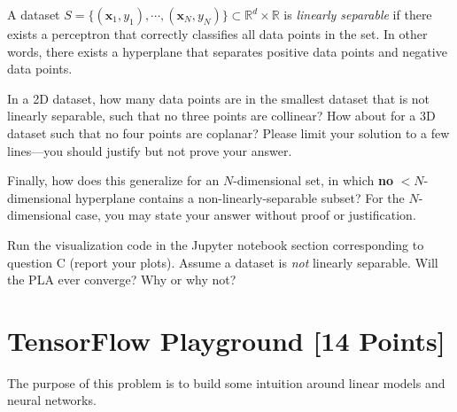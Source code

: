 \begin{solution}


\end{solution}

\begin{problem}[4]
A dataset $S = \{(\mathbf{x}_1, y_1),\cdots,(\mathbf{x}_N, y_N)\} \subset \mathbb{R}^d \times \mathbb{R}$ is \emph{linearly separable} if there exists a perceptron that correctly classifies all data points in the set.
In other words, there exists a hyperplane that separates positive data points and negative data points.

In a 2D dataset, how many data points are in the smallest dataset that is not linearly separable, such that no three points are collinear? How about for a 3D dataset such that no four points are coplanar?
Please limit your solution to a few lines---you should justify but not prove your answer.

Finally, how does this generalize for an $N$-dimensional set, in which \textbf{no} $<N$-dimensional hyperplane contains a non-linearly-separable subset?
For the $N$-dimensional case, you may state your answer without proof or justification.
\end{problem}
\begin{solution}

\end{solution}

\begin{problem}[2]
Run the visualization code in the Jupyter notebook section corresponding to question C (report your plots).
Assume a dataset is \emph{not} linearly separable.
Will the PLA ever converge?
Why or why not?
\end{problem}
\begin{solution}

\end{solution}

\newpage
\section{TensorFlow Playground [14 Points]}

The purpose of this problem is to build some intuition around linear models and neural networks.

